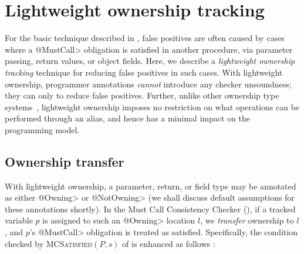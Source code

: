 \section{Lightweight ownership tracking}
\label{sec:lightweight-ownership}


For the basic technique described in , false
positives are often caused by cases where a \<@MustCall> obligation is satisfied
in another procedure, via parameter passing, return values, or object fields.
Here, we describe a \emph{lightweight ownership tracking} technique for reducing
false positives in such cases.  With lightweight ownership, programmer
annotations \emph{cannot} introduce any checker unsoundness; they can only to
reduce false positives.  Further, unlike other ownership type systems~,
lightweight ownership imposes no restriction on what operations can be performed
through an alias, and hence has a minimal impact on the programming model.


\subsection{Ownership transfer}
\label{sec:ownership-transfer}


With lightweight ownership, a parameter, return, or field type may be annotated
as either \<@Owning> or \<@NotOwning> (we shall discuss default assumptions for
these annotations shortly).  In
the Must Call Consistency Checker (), if a tracked
variable $p$ is assigned to such an \<@Owning> location $l$, we \emph{transfer}
ownership to $l$, and $p$'s \<@MustCall> obligation
is treated as satisfied. Specifically, the condition checked by
\textsc{MCSatisfied}$(P,s)$ of  is enhanced as follows
:

